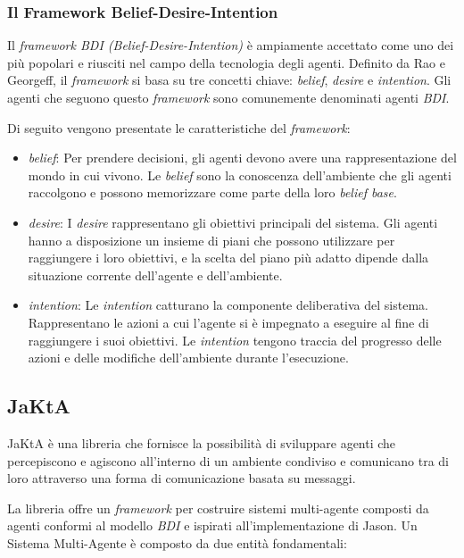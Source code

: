 \subsubsection{Il Framework Belief-Desire-Intention}
Il \textit{framework BDI (Belief-Desire-Intention)} è ampiamente accettato come uno dei più popolari e riusciti nel campo della tecnologia degli agenti. Definito da Rao e Georgeff, il \textit{framework} si basa su tre concetti chiave: \textit{belief}, \textit{desire} e \textit{intention}. Gli agenti che seguono questo \textit{framework} sono comunemente denominati agenti \textit{BDI}.

Di seguito vengono presentate le caratteristiche del \textit{framework}:

\begin{itemize}
    \item \textit{belief}: Per prendere decisioni, gli agenti devono avere una rappresentazione del mondo in cui vivono. Le \textit{belief} sono la conoscenza dell'ambiente che gli agenti raccolgono e possono memorizzare come parte della loro \textit{belief base}.
    \item \textit{desire}: I \textit{desire} rappresentano gli obiettivi principali del sistema. Gli agenti hanno a disposizione un insieme di piani che possono utilizzare per raggiungere i loro obiettivi, e la scelta del piano più adatto dipende dalla situazione corrente dell'agente e dell'ambiente.
    \item \textit{intention}: Le \textit{intention} catturano la componente deliberativa del sistema. Rappresentano le azioni a cui l'agente si è impegnato a eseguire al fine di raggiungere i suoi obiettivi. Le \textit{intention} tengono traccia del progresso delle azioni e delle modifiche dell'ambiente durante l'esecuzione.
\end{itemize}

\subsection{JaKtA}
JaKtA\cite{10.1007/978-3-031-43264-4_4} è una libreria che fornisce la possibilità di sviluppare agenti che percepiscono e agiscono all'interno di un ambiente condiviso e comunicano tra di loro attraverso una forma di comunicazione basata su messaggi.

La libreria offre un \textit{framework} per costruire sistemi multi-agente composti da agenti conformi al modello \textit{BDI} e ispirati all'implementazione di Jason\cite{Bordini2005}. Un Sistema Multi-Agente è composto da due entità fondamentali:


